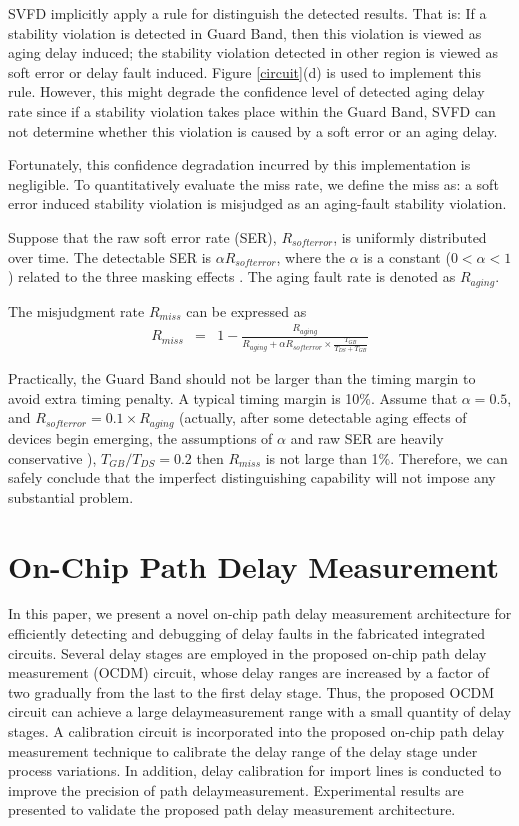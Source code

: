 SVFD implicitly apply a rule for distinguish the detected results. That is: If a stability violation is detected in Guard Band, then this violation is viewed as aging delay induced; the stability violation detected in other region is viewed as soft error or delay fault induced. Figure \ref{circuit}(d) is used to implement this rule. However, this might degrade the confidence level of detected aging delay rate since if a stability violation takes place within the Guard Band, SVFD can not determine whether this violation is caused by a soft error or an aging delay.

Fortunately, this confidence degradation incurred by this implementation is negligible. To quantitatively evaluate the miss rate, we define the miss as: a soft error induced stability violation is misjudged as an aging-fault stability violation.

Suppose that the raw soft error rate (SER), $R_{soft error}$, is uniformly distributed over time. The detectable SER is $\alpha R_{softerror}$, where the $\alpha$ is a constant ($0<\alpha<1$) related to the three masking effects \cite{Shivakumar_DSN02}. The aging fault rate is denoted as $R_{aging}$.

The misjudgment rate $R_{miss}$ can be expressed as
\begin{eqnarray}\nonumber
R_{miss}&=&1-\frac{R_{aging}}{R_{aging} + \alpha R_{soft error}\times\frac{T_{GB}}{T_{DS}+T_{GB}}}
\end{eqnarray}

Practically, the Guard Band should not be larger than the timing margin to avoid extra timing penalty. A typical timing margin is 10\%. Assume that $\alpha=0.5$, and $R_{soft error} =0.1\times R_{aging}$ (actually, after some detectable aging effects of devices begin emerging, the assumptions of $\alpha$ and raw SER are heavily conservative ), $T_{GB}/T_{DS}=0.2$ then $R_{miss}$ is not large than 1\%. Therefore, we can safely conclude that the imperfect distinguishing capability will not impose any substantial problem.

\section{On-Chip Path Delay Measurement}
In this paper, we present a novel on-chip path delay measurement architecture for efficiently detecting and debugging of delay faults in the fabricated integrated circuits. Several delay stages are employed in the proposed on-chip path delay measurement (OCDM) circuit, whose delay ranges are increased by a factor of two gradually from the last to the first delay stage. Thus, the proposed OCDM circuit can achieve a large delaymeasurement range with a small quantity of delay stages. A calibration circuit is incorporated into the proposed on-chip path delay measurement technique to calibrate the delay range of the delay stage under process variations. In addition, delay calibration for import lines is conducted to improve the precision of path delaymeasurement. Experimental results are presented to validate the proposed path delay measurement architecture.

